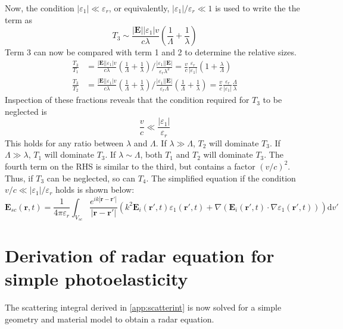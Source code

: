 \documentclass[10pt,a4paper]{eitExjobb}
\begin{document}
	Now, the condition $|\varepsilon_1| \ll \varepsilon_r$, or equivalently, $|\varepsilon_1|/\varepsilon_r \ll 1$ is used to write the the term as
	\begin{equation*}
	T_3 \sim \frac{|\bm{E}| |\varepsilon_1| v}{c\lambda} \left( \frac{1}{\Lambda} + \frac{1}{\lambda} \right)
	\end{equation*}
	Term 3 can now be compared with term 1 and 2 to determine the relative sizes.
	\begin{align*}
	\frac{T_3}{T_1} &= \frac{|\bm{E}| |\varepsilon_1| v}{c\lambda} \left( \frac{1}{\Lambda} + \frac{1}{\lambda} \right)
	\bigg/
	\frac{|\varepsilon_1| |\bm{E}|}{\varepsilon_r \lambda^2} =
	\frac{v}{c} \frac{\varepsilon_r}{|\varepsilon_1|} \left( 1 + \frac{\lambda}{\Lambda} \right) \\
	\frac{T_3}{T_2} &= \frac{|\bm{E}| |\varepsilon_1| v}{c\lambda} \left( \frac{1}{\Lambda} + \frac{1}{\lambda} \right)
	\bigg/
	\frac{|\varepsilon_1| |\bm{E}|}{\varepsilon_r \Lambda} \left( \frac{1}{\Lambda} + \frac{1}{\lambda} \right) =
	\frac{v}{c} \frac{\varepsilon_r}{|\varepsilon_1|} \frac{\Lambda}{\lambda}
	\end{align*}
	Inspection of these fractions reveals that the condition required for $T_3$ to be neglected is
	\begin{equation*}
	\frac{v}{c} \ll \frac{|\varepsilon_1|}{\varepsilon_r}
	\end{equation*}
	This holds for any ratio between $\lambda$ and $\Lambda$. If $\lambda \gg \Lambda$, $T_2$ will dominate $T_3$. If $\Lambda \gg \lambda$, $T_1$ will dominate $T_3$. If $\lambda \sim \Lambda$, both $T_1$ and $T_2$ will dominate $T_3$. The fourth term on the RHS is similar to the third, but contains a factor $(v/c)^2$. Thus, if $T_3$ can be neglected, so can $T_4$.	The simplified equation if the condition $v/c \ll |\varepsilon_1|/\varepsilon_r$ holds is shown below:
	\begin{equation*}
	\boxed{
		\bm{E}_{sc}(\bm{r},t) = \frac{1}{4\pi\varepsilon_r} \int_{V_{sc}} \frac{e^{ik |\bm{r}-\bm{r'}| }}{ |\bm{r}-\bm{r'}|} \left( k^2 \bm{E}_i (\bm{r'},t) \varepsilon_1 (\bm{r'},t) + \nabla (\bm{E}_i (\bm{r'},t) \cdot \nabla \varepsilon_1 (\bm{r'},t)) \right) \mathrm{d}v'
	}
	\end{equation*}
	
	\section{Derivation of radar equation for simple photoelasticity \label{app:radareq}}
	The scattering integral derived in \ref{app:scatterint} is now solved for a simple geometry and material model to obtain a radar equation.
	
\end{document}
